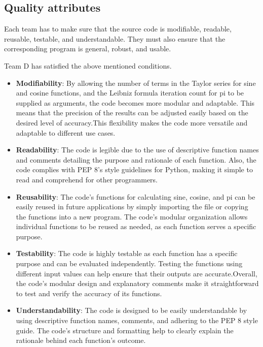   \subsection{Quality attributes}
  \begin{flushleft}
    Each team has to make sure that the source code is modifiable, readable, reusable, testable, and understandable. They must also ensure that the corresponding program is general, robust, and usable.
  \end{flushleft}
  \begin{flushleft}
    Team D has satisfied the above mentioned conditions.
    \begin{itemize}
         \item \textbf{Modifiability}: By allowing the number of terms in the Taylor series for sine and cosine functions, and the Leibniz formula iteration count for pi to be supplied as arguments, the code becomes more modular and adaptable. This means that the precision of the results can be adjusted easily based on the desired level of accuracy.This flexibility makes the code more versatile and adaptable to different use cases.
    
         \item \textbf{Readability}: The code is legible due to the use of descriptive function names and comments detailing the purpose and rationale of each function. Also, the code complies with PEP 8's style guidelines for Python, making it simple to read and comprehend for other programmers.
    
         \item \textbf{Reusability}: The code's functions for calculating sine, cosine, and pi can be easily reused in future applications by simply importing the file or copying the functions into a new program. The code's modular organization allows individual functions to be reused as needed, as each function serves a specific purpose.
    
         \item \textbf{Testability}: The code is highly testable as each function has a specific purpose and can be evaluated independently. Testing the functions using different input values can help ensure that their outputs are accurate.Overall, the code's modular design and explanatory comments make it straightforward to test and verify the accuracy of its functions.
    
         \item \textbf{Understandability}: The code is designed to be easily understandable by using descriptive function names, comments, and adhering to the PEP 8 style guide. The code's structure and formatting help to clearly explain the rationale behind each function's outcome.
    
        
    \end{itemize}
  \end{flushleft}
